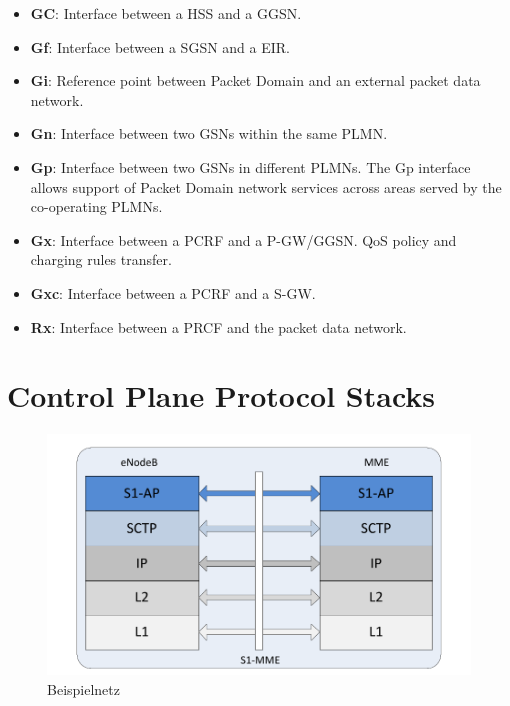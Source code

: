 \begin{itemize}
\item \textbf{GC}: Interface between a HSS and a GGSN.
\item \textbf{Gf}: Interface between a SGSN and a EIR.
\item \textbf{Gi}: Reference point between Packet Domain and an external packet data network.
\item \textbf{Gn}: Interface between two GSNs within the same PLMN.
\item \textbf{Gp}: Interface between two GSNs in different PLMNs. The Gp interface allows support of Packet Domain network services across areas served by the co-operating PLMNs.
\item \textbf{Gx}: Interface between a PCRF and a P-GW/GGSN. QoS policy and charging rules transfer.
\item \textbf{Gxc}: Interface between a PCRF and a S-GW.

\item \textbf{Rx}: Interface between a PRCF and the packet data network.
\end{itemize}

\section{Control Plane Protocol Stacks}

\begin{figure}[htbp]
 \centering
 \includegraphics[width=1.0\textwidth]{images/3gpp/eNB-MME-layers.pdf}
 \caption{Beispielnetz}\label{fig:3gpp-enbmme}
\end{figure}

